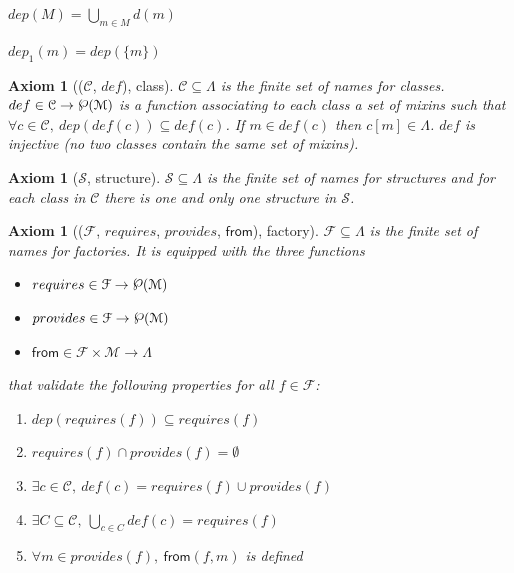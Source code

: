 \documentclass[a4paper,UKenglish,cleveref, autoref]{lipics-v2019}
\newcommand{\Lang}{\ensuremath{\Lambda}}
\newcommand{\mixins}{mixins}
\newcommand{\M}{\ensuremath{\mathcal{M}}}
\newcommand{\factory}{factory}
\newcommand{\factories}{factories}
\newcommand{\F}{\ensuremath{\mathcal{F}}}
\newcommand{\depx}{\ensuremath{d}}
\newcommand{\dep}{\ensuremath{dep}}
\newcommand{\depone}{\ensuremath{dep_1}}
\newcommand{\powerset}[1]{\raisebox{.15\baselineskip}{\Large\ensuremath{\wp}}(#1)}
\newcommand{\C}{\ensuremath{\mathcal{C}}}
\newcommand{\class}{class}
\newcommand{\classes}{classes}
\newcommand{\cdef}{\ensuremath{def}}
\newcommand{\Str}{\ensuremath{\mathcal{S}}}
\newcommand{\structure}{structure}
\newcommand{\structures}{structures}
\newcommand{\requires}{\ensuremath{requires}}
\newcommand{\provides}{\ensuremath{provides}}
\newcommand{\from}{\ensuremath{\mathsf{from}}}
\newcommand{\proj}[2]{\ensuremath{#1[#2]}}
\theoremstyle{implem}
\theoremstyle{implem}
\newcounter{axiomcounter}
\theoremstyle{axiom}
\newtheorem{axiom}[axiomcounter]{Axiom}
\theoremstyle{abscommand}
\theoremstyle{command}
\begin{document}
\begin{definition}[\(\dep \in \powerset{\M{}} \to \powerset\M{}\)]\label{def:depxs}
\(
  \dep{}(M) = \bigcup_{m \in M} \depx (m)
\)
\end{definition}

\begin{definition}[\(\depone{} \in \M{} \to \powerset\M{}\)]\label{def:dep}
\(\depone{}(m) = \dep{}(\{m\})\)
\end{definition}

\begin{axiom}[(\C{}, \cdef{}), \class{}]\label{def:class}
\(\C{} \subseteq \Lang{}\) is the finite set of names for \classes{}.
\(\cdef{} \in \C \to \powerset\M{}\) is a function associating to
each \class{} a set of \mixins{}
such that \(\forall c \in \C{},~ \dep{}(\cdef{}(c)) \subseteq \cdef{}(c)\).
If \(m \in \cdef{}(c) \) then \( \proj{c}{m} \in \Lang{} \).
\cdef{} is injective (no two \classes{} contain the same set of \mixins{}).
\end{axiom}

\begin{axiom}[\Str{}, \structure{}]\label{def:structure}
\(\Str{} \subseteq \Lang{} \) is the finite set of names for \structures{}
and for each \class{} in \C{} there is one and only one \structure{}
in \Str{}.
\end{axiom}

\begin{axiom}[(\F{}, \requires{}, \provides{}, \from{}), \factory{}]\label{def:factory}
  \(\F{} \subseteq \Lang{} \) is the finite set of names for \factories{}.
  It is equipped with the three functions
  \begin{itemize}
    \item\( \requires{} \in \F{} \to \powerset\M{} \)
    \item\( \provides{} \in \F{} \to \powerset\M{} \)
    \item\( \from{} \in \F{} \times \M{} \to \Lang{} \)
  \end{itemize}
  that validate the following properties for all \(f \in \F{}\):
  \begin{enumerate}
    \item\( \dep{}(\requires{}(f)) \subseteq \requires{}(f)\)
    \item\( \requires{}(f) \cap \provides{}(f) = \emptyset \)
    \item\( \exists c \in \C{},~ \cdef{}(c) = \requires{}(f) \cup \provides{}(f) \)
    \item\( \exists C \subseteq \C{},~\bigcup_{c\in C}\cdef{}(c) = \requires{}(f)\)
    \item\( \forall m \in \provides{}(f),~ \from{}(f,m) \) is defined
  \end{enumerate}
\end{axiom}
\end{document}
